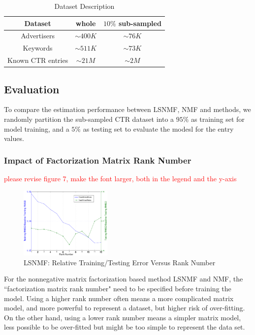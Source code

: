\begin{table}[!ht]
\centering
\begin{tabular}{|c|c|c|}
  \hline	\hline
  Dataset & whole & $10\%$ sub-sampled\\ \hline
  Advertisers & $\sim 400K$ & $\sim 76K$  \\ 
  Keywords & $\sim 511K$ & $\sim 73K$  \\ 
  Known CTR entries &  $\sim 21M$ & $\sim 2M$ \\ \hline
\end{tabular}
\caption{Dataset Description}
\label{tab:data}
\end{table}

\subsection{Evaluation}
To compare the estimation performance between LSNMF, NMF and {\sppan}
methods, we  randomly  partition the sub-sampled CTR dataset into a $95\%$  as training set for model training,  and a $5\%$ as testing set to evaluate the modesl for the entry values. 


\subsubsection{Impact of Factorization Matrix Rank Number}
\textcolor{red}{please revise figure 7, make the font larger, both in the legend and the y-axis}

\begin{figure}[!ht]
  \centering
  \includegraphics[width=0.4\textwidth]{figures/learning_curve_lsnmf_subsample_relative.eps}
  \caption{LSNMF: Relative Training/Testing Error Versus Rank Number}
  \label{fig:lsnmf_learning}
\end{figure}

For the nonnegative matrix factorization based method LSNMF and NMF,
the ``factorization matrix rank number"\cite{??} need to be specified before training the
model. Using a higher rank number often means a more complicated
matrix model, and more powerful to represent a dataset, but higher risk of over-fitting. On the other hand, using a lower rank
number means a simpler matrix model,  less possible to be
over-fitted but might be too simple to represent the data set. 

